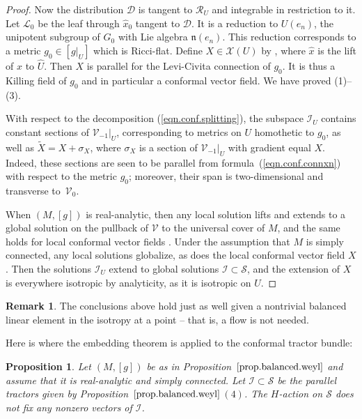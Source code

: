 \documentclass[pdftex]{sigma}
\numberwithin{equation}{section}
\newtheorem{prop}[thm]{Proposition}
\theoremstyle{definition}
\newtheorem{rem}[thm]{Remark}
\def\n{{\mathfrak n}}
\begin{document}
\begin{proof}
Now the distribution $\mathcal{D}$ is tangent to $\mathcal{R}_U$ and integrable in restriction to it. Let $\mathcal{L}_0$ be the leaf through $\hat{x}_0$ tangent to $\mathcal{D}$. It is a reduction to $U(e_n)$, the unipotent subgroup of $G_0$ with Lie algebra $\n(e_n)$. This reduction corresponds to a metric $g_0 \in [ g|_U]$ which is Ricci-flat. Define $X \in \mathcal{X}(U)$ by , where $\hat{x}$ is the lift of $x$ to $\hat{U}$. Then $X$ is parallel for the Levi-Civita connection of $g_0$. It is thus a Killing field of $g_0$ and in particular a conformal vector field. We have proved (1)--(3).

With respect to the decomposition (\ref{eqn.conf.splitting}), the subspace $\mathcal{I}_U$ contains constant sections of $ \mathcal{V}_{-1} |_U$, corresponding to metrics on $U$ homothetic to $g_0$, as well as $\tilde{X} = X + \sigma_X$, where $\sigma_X$ is a section of $ \mathcal{V}_{-1} |_U$ with gradient equal $X$. Indeed, these sections are seen to be parallel from formula~(\ref{eqn.conf.connxn}) with respect to the metric $g_0$; moreover, their span is two-dimensional and transverse to~$\mathcal{V}_0$.

When $(M,[g])$ is real-analytic, then any local solution lifts and extends to a global solution on the pullback of $\mathcal{V}$ to the universal cover of ${M}$, and the same holds for local conformal vector fields \cite{amores.killing}. Under the assumption that $M$ is simply connected, any local solutions globalize, as does the local conformal vector field $X$. Then the solutions $\mathcal{I}_U$ extend to global solutions $\mathcal{I} \subset \mathcal{S}$, and the extension of $X$ is everywhere isotropic by analyticity, as it is isotropic on $U$.
\end{proof}

\begin{rem}
The conclusions above hold just as well given a nontrivial balanced linear element in the isotropy at a point -- that is, a flow is not needed.
\end{rem}

Here is where the embedding theorem is applied to the conformal tractor bundle:

\begin{prop}
\label{prop.soln.not.fixed}
Let $(M,[g])$ be as in Proposition~$\ref{prop.balanced.weyl}$ and assume that it is real-analytic and simply connected. Let $\mathcal{I} \subset \mathcal{S}$ be the parallel tractors given by Proposition~$\ref{prop.balanced.weyl}$\,$(4)$.
The $H$-action on $\mathcal{S}$ does not fix any nonzero vectors of $\mathcal{I}$.
\end{prop}
\end{document}
